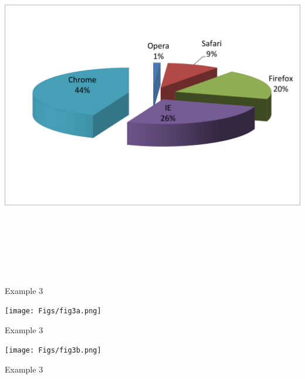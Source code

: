 \documentclass[12pt]{article}
\newcommand{\headsize}{\fontsize{35}{35} \selectfont}
\begin{document}
\centerline{\includegraphics[height=6in]{Figs/fig2e.png}}



\newpage


\headsize \color{myyellow}
\hfill \begin{minipage}{5.75in}
\centering
Example 3
\end{minipage}

\vspace{30mm}

\centerline{\texttt{[image: Figs/fig3a.png]}}




\newpage


\headsize \color{myyellow}
\hfill \begin{minipage}{5.75in}
\centering
Example 3
\end{minipage}

\vspace{30mm}

\centerline{\texttt{[image: Figs/fig3b.png]}}



\newpage


\headsize \color{myyellow}
\hfill \begin{minipage}{5.75in}
\centering
Example 3
\end{minipage}
\end{document}
